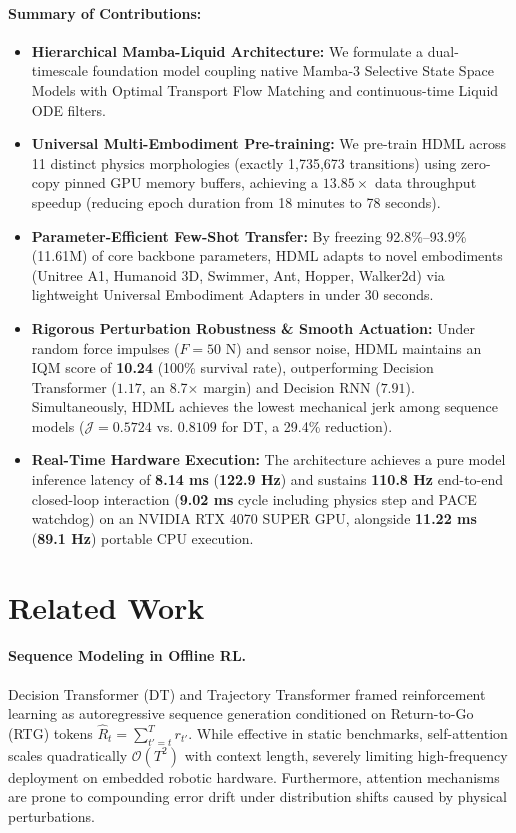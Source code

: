 \documentclass{article}
\begin{document}
\paragraph{Summary of Contributions:}
\begin{itemize}
    \item \textbf{Hierarchical Mamba-Liquid Architecture:} We formulate a dual-timescale foundation model coupling native Mamba-3 Selective State Space Models with Optimal Transport Flow Matching and continuous-time Liquid ODE filters.
    \item \textbf{Universal Multi-Embodiment Pre-training:} We pre-train HDML across 11 distinct physics morphologies (exactly 1,735,673 transitions) using zero-copy pinned GPU memory buffers, achieving a $13.85\times$ data throughput speedup (reducing epoch duration from 18 minutes to 78 seconds).
    \item \textbf{Parameter-Efficient Few-Shot Transfer:} By freezing 92.8\%--93.9\% (11.61M) of core backbone parameters, HDML adapts to novel embodiments (Unitree A1, Humanoid 3D, Swimmer, Ant, Hopper, Walker2d) via lightweight Universal Embodiment Adapters in under 30 seconds.
    \item \textbf{Rigorous Perturbation Robustness \& Smooth Actuation:} Under random force impulses ($F=50\text{ N}$) and sensor noise, HDML maintains an IQM score of \textbf{10.24} (100\% survival rate), outperforming Decision Transformer ($1.17$, an 8.7$\times$ margin) and Decision RNN ($7.91$). Simultaneously, HDML achieves the lowest mechanical jerk among sequence models ($\mathcal{J}=0.5724$ vs. $0.8109$ for DT, a 29.4\% reduction).
    \item \textbf{Real-Time Hardware Execution:} The architecture achieves a pure model inference latency of \textbf{8.14 ms} (\textbf{122.9 Hz}) and sustains \textbf{110.8 Hz} end-to-end closed-loop interaction (\textbf{9.02 ms} cycle including physics step and PACE watchdog) on an NVIDIA RTX 4070 SUPER GPU, alongside \textbf{11.22 ms} (\textbf{89.1 Hz}) portable CPU execution.
\end{itemize}

\section{Related Work}
\label{sec:related_work}

\paragraph{Sequence Modeling in Offline RL.} 
Decision Transformer (DT) \cite{chen2021decision} and Trajectory Transformer framed reinforcement learning as autoregressive sequence generation conditioned on Return-to-Go (RTG) tokens $\hat{R}_t = \sum_{t'=t}^T r_{t'}$. While effective in static benchmarks, self-attention scales quadratically $\mathcal{O}(T^2)$ with context length, severely limiting high-frequency deployment on embedded robotic hardware. Furthermore, attention mechanisms are prone to compounding error drift under distribution shifts caused by physical perturbations.
\end{document}
